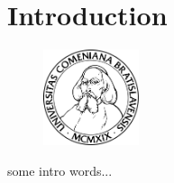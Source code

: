 \documentclass[12pt, oneside]{book}
\author{\mfauthor}
\title{\thesisname}
\date{\mfyear}
\begin{document}
  
  \newpage

  
  \newpage




  \section{Introduction}
    \begin{figure}
      \includegraphics[width=0.25\textwidth]{komlogo-new}
    \end{figure}
    some intro words...
\end{document}
